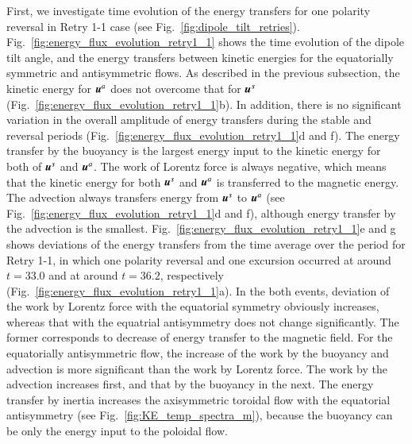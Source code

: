 First, we investigate time evolution of the energy transfers for one polarity reversal in Retry 1-1 case (see Fig.~\ref{fig:dipole_tilt_retries}). 
Fig.~\ref{fig:energy_flux_evolution_retry1_1} shows the time evolution of the dipole tilt angle, and the energy transfers between kinetic energies for the equatorially symmetric and antisymmetric flows.
As described in the previous subsection, the kinetic energy for $\mbox{\boldmath$u$}^a$ does not overcome that for $\mbox{\boldmath$u$}^s$ (Fig.~\ref{fig:energy_flux_evolution_retry1_1}b).
In addition, there is no significant variation in the overall amplitude of energy transfers during the stable and reversal periods (Fig.~\ref{fig:energy_flux_evolution_retry1_1}d and f).
The energy transfer by the buoyancy is the largest energy input to the kinetic energy for both of $\mbox{\boldmath$u$}^s$ and $\mbox{\boldmath$u$}^a$.
The work of Lorentz force is always negative, which means that the kinetic energy for both $\mbox{\boldmath$u$}^s$ and $\mbox{\boldmath$u$}^a$ is transferred to the magnetic energy.
The advection always transfers energy from $\mbox{\boldmath$u$}^s$ to $\mbox{\boldmath$u$}^a$ (see Fig.~\ref{fig:energy_flux_evolution_retry1_1}d and f), although energy transfer by the advection is the smallest.
Fig.~\ref{fig:energy_flux_evolution_retry1_1}e and g shows deviations of the energy transfers from the time average over the period for Retry 1-1, in which one polarity reversal and one excursion occurred at around $t = 33.0$ and at around $t = 36.2$, respectively (Fig.~\ref{fig:energy_flux_evolution_retry1_1}a).
In the both events, deviation of the work by Lorentz force with the equatorial symmetry obviously increases, whereas that with the equatrial antisymmetry does not change significantly.
The former corresponds to decrease of energy transfer to the magnetic field.
For the equatorially antisymmetric flow, the increase of the work by the buoyancy and advection %
is more significant than the work by Lorentz force.
The work by the advection increases first, and that by the buoyancy in the next. 
The energy transfer by inertia increases the axisymmetric toroidal flow with the equatorial antisymmetry (see Fig.~\ref{fig:KE_temp_spectra_m}), because the buoyancy can be only the energy input to the poloidal flow.






